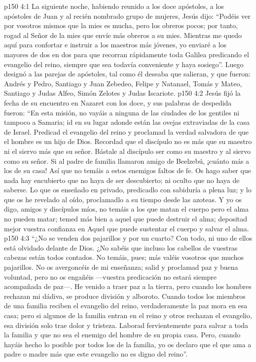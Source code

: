 \vs p150 4:1 La siguiente noche, habiendo reunido a los doce apóstoles, a los apóstoles de Juan y al recién nombrado grupo de mujeres, Jesús dijo: “Podéis ver por vosotros mismos que la mies es mucha, pero los obreros pocos; por tanto, rogad al Señor de la mies que envíe más obreros a su mies. Mientras me quedo aquí para confortar e instruir a los maestros más jóvenes, yo enviaré a los mayores de dos en dos para que recorran rápidamente toda Galilea predicando el evangelio del reino, siempre que sea todavía conveniente y haya sosiego”. Luego designó a las parejas de apóstoles, tal como él deseaba que salieran, y que fueron: Andrés y Pedro, Santiago y Juan Zebedeo, Felipe y Natanael, Tomás y Mateo, Santiago y Judas Alfeo, Simón Zelotes y Judas Iscariote.
\vs p150 4:2 Jesús fijó la fecha de su encuentro en Nazaret con los doce, y sus palabras de despedida fueron: “En esta misión, no vayáis a ninguna de las ciudades de los gentiles ni tampoco a Samaria; id en su lugar adonde están las ovejas extraviadas de la casa de Israel. Predicad el evangelio del reino y proclamad la verdad salvadora de que el hombre es un hijo de Dios. Recordad que el discípulo no es más que su maestro ni el siervo más que su señor. Bástale al discípulo ser como su maestro y al siervo como su señor. Si al padre de familia llamaron amigo de Beelzebú, ¡cuánto más a los de su casa! Así que no temáis a estos enemigos faltos de fe. Os hago saber que nada hay encubierto que no haya de ser descubierto; ni oculto que no haya de saberse. Lo que os enseñado en privado, predicadlo con sabiduría a plena luz; y lo que os he revelado al oído, proclamadlo a su tiempo desde las azoteas. Y yo os digo, amigos y discípulos míos, no temáis a los que matan el cuerpo pero el alma no pueden matar; temed más bien a aquel que puede destruir el alma; depositad mejor vuestra confianza en Aquel que puede sustentar el cuerpo y salvar el alma.
\vs p150 4:3 “¿No se venden dos pajarillos y por un cuarto? Con todo, ni uno de ellos está olvidado delante de Dios. ¿No sabéis que incluso los cabellos de vuestras cabezas están todos contados. No temáis, pues; más valéis vosotros que muchos pajarillos. No os avergoncéis de mi enseñanza; salid y proclamad paz y buena voluntad, pero no os engañéis ---vuestra predicación no estará siempre acompañada de paz---. He venido a traer paz a la tierra, pero cuando los hombres rechazan mi dádiva, se produce división y alboroto. Cuando todos los miembros de una familia reciben el evangelio del reino, verdaderamente la paz mora en esa casa; pero si algunos de la familia entran en el reino y otros rechazan el evangelio, esa división solo trae dolor y tristeza. Laborad fervientemente para salvar a toda la familia y que no sea el enemigo del hombre de su propia casa. Pero, cuando hayáis hecho lo posible por todos los de la familia, yo os declaro que el que ama a padre o madre más que este evangelio no es digno del reino”.
